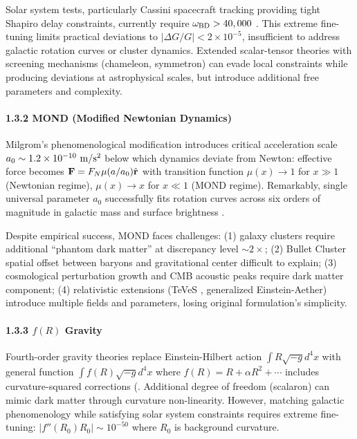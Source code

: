 \documentclass[11pt,a4paper]{article}
\begin{document}
Solar system tests, particularly Cassini spacecraft tracking providing
tight Shapiro delay constraints, currently require
\(\omega_{\rm BD} > 40,000\) \cite{Bertotti2003}. This extreme fine-tuning
limits practical deviations to \(|\Delta G/G| < 2 \times 10^{-5}\),
insufficient to address galactic rotation curves or cluster dynamics.
Extended scalar-tensor theories with screening mechanisms (chameleon,
symmetron) can evade local constraints while producing deviations at
astrophysical scales, but introduce additional free parameters and
complexity.

\hypertarget{mond-modified-newtonian-dynamics}{%
\paragraph{1.3.2 MOND (Modified Newtonian
Dynamics)}\label{mond-modified-newtonian-dynamics}}

Milgrom's phenomenological modification \cite{Milgrom1983} introduces critical
acceleration scale \(a_0 \sim 1.2 \times 10^{-10}~{\rm m/s^2}\) below
which dynamics deviate from Newton: effective force becomes
\({\bf F} = F_N \mu(a/a_0)\hat{{\bf r}}\) with transition function
\(\mu(x) \to 1\) for \(x \gg 1\) (Newtonian regime), \(\mu(x) \to x\)
for \(x \ll 1\) (MOND regime). Remarkably, single universal parameter
\(a_0\) successfully fits rotation curves across six orders of magnitude
in galactic mass and surface brightness \cite{Famaey2012}.

Despite empirical success, MOND faces challenges: (1) galaxy clusters
require additional ``phantom dark matter'' at discrepancy level
\(\sim 2\times\); (2) Bullet Cluster spatial offset between baryons and
gravitational center difficult to explain; (3) cosmological perturbation
growth and CMB acoustic peaks require dark matter component; (4)
relativistic extensions (TeVeS \cite{Bekenstein2004}, generalized Einstein-Aether) introduce
multiple fields and parameters, losing original formulation's
simplicity.

\hypertarget{fr-gravity}{%
\paragraph{\texorpdfstring{1.3.3 \(f(R)\)
Gravity}{1.3.3 f(R) Gravity}}\label{fr-gravity}}

Fourth-order gravity theories replace Einstein-Hilbert action
\(\int R\sqrt{-g}d^4x\) with general function \(\int f(R)\sqrt{-g}d^4x\)
where \(f(R) = R + \alpha R^2 + \cdots\) includes curvature-squared
corrections (\cite{Sotiriou2010}. Additional degree of freedom
(scalaron) can mimic dark matter through curvature non-linearity.
However, matching galactic phenomenology while satisfying solar system
constraints requires extreme fine-tuning:
\(|f''(R_0)R_0| \sim 10^{-50}\) where \(R_0\) is background curvature.
\end{document}
